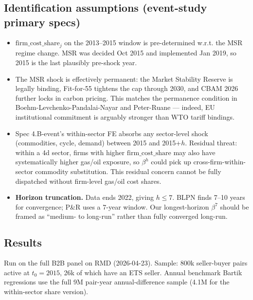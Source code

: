 \documentclass[11pt]{article}
\begin{document}
\subsection{Identification assumptions (event-study primary specs)}

\begin{itemize}
  \item $\mathrm{firm\_cost\_share}_j$ on the 2013--2015 window is pre-determined w.r.t. the MSR regime change. MSR was decided Oct 2015 and implemented Jan 2019, so 2015 is the last plausibly pre-shock year.
  \item The MSR shock is effectively permanent: the Market Stability Reserve is legally binding, Fit-for-55 tightens the cap through 2030, and CBAM 2026 further locks in carbon pricing. This matches the permanence condition in Boehm-Levchenko-Pandalai-Nayar and Peter-Ruane --- indeed, EU institutional commitment is arguably stronger than WTO tariff bindings.
  \item Spec 4.B-event's within-sector FE absorbs any sector-level shock (commodities, cycle, demand) between 2015 and 2015+$h$. Residual threat: within a 4d sector, firms with higher $\mathrm{firm\_cost\_share}$ may also have systematically higher gas/oil exposure, so $\beta^h$ could pick up cross-firm-within-sector commodity substitution. This residual concern cannot be fully dispatched without firm-level gas/oil cost shares.
  \item \textbf{Horizon truncation.} Data ends 2022, giving $h\leq 7$. BLPN finds 7--10 years for convergence; P\&R uses a 7-year window. Our longest-horizon $\beta^7$ should be framed as ``medium- to long-run'' rather than fully converged long-run.
\end{itemize}

\subsection{Results}

Run on the full B2B panel on RMD (2026-04-23). Sample: 800k seller-buyer pairs active at $t_0=2015$, 26k of which have an ETS seller. Annual benchmark Bartik regressions use the full 9M pair-year annual-difference sample (4.1M for the within-sector share version).
\end{document}
